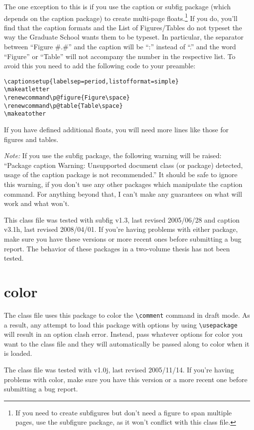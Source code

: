 The one exception to this is if you use the caption or subfig package (which depends on the caption package) to create multi-page floats.\footnote{If you need to create subfigures but don't need a figure to span multiple pages, use the subfigure package, as it won't conflict with this class file.} If you do, you'll find that the caption formats and the List of Figures/Tables do not typeset the way the Graduate School wants them to be typeset.  In particular, the separator between ``Figure \#.\#'' and the caption will be ``:\space'' instead of ``.\space'' and the word ``Figure'' or ``Table'' will not accompany the number in the respective list.  To avoid this you need to add the following code to your preamble:
\begin{verbatim}
\captionsetup{labelsep=period,listofformat=simple}
\makeatletter
\renewcommand\p@figure{Figure\space}
\renewcommand\p@table{Table\space}
\makeatother
\end{verbatim}
If you have defined additional floats, you will need more lines like those for figures and tables.

\emph{Note:} If you use the subfig package, the following warning will be raised: ``Package caption Warning: Unsupported document class (or package) detected, usage of the caption package is not recommended.''  It should be safe to ignore this warning, if you don't use any other packages which manipulate the caption command.  For anything beyond that, I can't make any guarantees on what will work and what won't.

This class file was tested with subfig v1.3, last revised 2005/06/28 and caption v3.1h, last revised 2008/04/01.  If you're having problems with either package, make sure you have these versions or more recent ones before submitting a bug report.  The behavior of these packages in a two-volume thesis has not been tested.

\section{color}
The class file uses this package to color the \verb=\comment= command in draft mode.  As a result, any attempt to load this package with options by using \verb=\usepackage= will result in an option clash error.  Instead, pass whatever options for color you want to the class file and they will automatically be passed along to color when it is loaded.

The class file was tested with v1.0j, last revised 2005/11/14.  If you're having problems with color, make sure you have this version or a more recent one before submitting a bug report.

